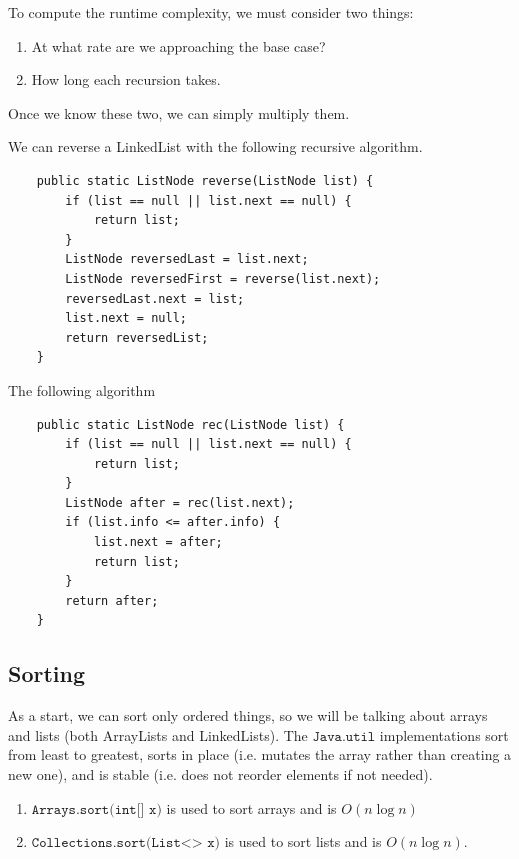 \documentclass{article}
\begin{document}
    \begin{theorem}
    To compute the runtime complexity, we must consider two things: 
    \begin{enumerate}
        \item At what rate are we approaching the base case? 
        \item How long each recursion takes. 
    \end{enumerate}
    Once we know these two, we can simply multiply them. 
    \end{theorem}

    \begin{example}[Reverse]
    We can reverse a LinkedList with the following recursive algorithm. 
    \begin{lstlisting}
    public static ListNode reverse(ListNode list) {
        if (list == null || list.next == null) {
            return list; 
        }
        ListNode reversedLast = list.next; 
        ListNode reversedFirst = reverse(list.next); 
        reversedLast.next = list; 
        list.next = null; 
        return reversedList; 
    }
    \end{lstlisting}
    \end{example}

    \begin{example}
    The following algorithm 
    \begin{lstlisting}
    public static ListNode rec(ListNode list) {
        if (list == null || list.next == null) {
            return list; 
        }
        ListNode after = rec(list.next); 
        if (list.info <= after.info) {
            list.next = after; 
            return list; 
        }
        return after; 
    }
    \end{lstlisting}
    \end{example}

  \subsection{Sorting}

    As a start, we can sort only ordered things, so we will be talking about arrays and lists (both ArrayLists and LinkedLists). The $\texttt{Java.util}$ implementations sort from least to greatest, sorts in place (i.e. mutates the array rather than creating a new one), and is stable (i.e. does not reorder elements if not needed). 
    \begin{enumerate}
        \item $\texttt{Arrays.sort(int[] x)}$ is used to sort arrays and is $O(n \log{n})$ 
        \item $\texttt{Collections.sort(List<> x)}$ is used to sort lists and is $O(n \log{n})$. 
    \end{enumerate}
\end{document}
